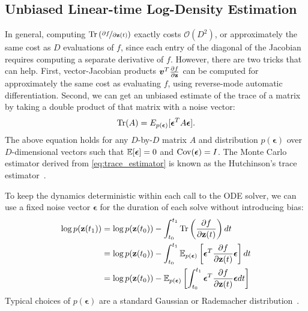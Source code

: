 \documentclass{article} %
\newcommand{\z}{\mathbf{z}}
\newcommand{\veps}{\bm{\epsilon}}
\newcommand{\JTr}{\Tr\left(\frac{\partial f}{\partial \z(t)}\right)}
\newcommand{\jtr}{\Tr\left(\nicefrac{\partial f}{\partial \z(t)}\right)}
\newcommand\0{\kern-1.2pt\vec{\kern1.2pt 0}}
\begin{document}
\subsection{Unbiased Linear-time Log-Density Estimation}

In general, computing $\jtr$ exactly costs $\mathcal{O}(D^2)$, or approximately the same cost as $D$ evaluations of $f$, since each entry of the diagonal of the Jacobian requires computing a separate derivative of $f$.
However, there are two tricks that can help.
First, vector-Jacobian products $\vv^T \frac{\partial f}{\partial \z}$ can be computed for approximately the same cost as evaluating $f$, using reverse-mode automatic differentiation.
Second, we can get an unbiased estimate of the trace of a matrix by taking a double product of that matrix with a noise vector:
%
\begin{align}\label{eq:trace_estimator}
\Tr(A) = E_{p(\veps)}[\veps^T A \veps].
\end{align}
%
The above equation holds for any $D$-by-$D$ matrix $A$ and distribution $p(\veps)$ over $D$-dimensional vectors such that $\E[\veps] = 0$ and $\Cov(\veps) = I$.
The Monte Carlo estimator derived from \eqref{eq:trace_estimator} is known as the Hutchinson's trace estimator~\citep{hutchinson1989trace,adams2018trace}.

To keep the dynamics deterministic within each call to the ODE solver, we can use a fixed noise vector $\veps$ for the duration of each solve without introducing bias:
%
\begin{align}\label{eq:stochastic_ode}
    \log p(\z(t_1)) & = \log p(\z(t_0)) - \int_{t_0}^{t_1} \JTr dt\nonumber\\
              &= \log p(\z(t_0)) - \int_{t_0}^{t_1} \E_{p(\veps)}\left[\veps^T \frac{\partial f}{\partial \z(t)}\veps\right]dt \nonumber\\
              &= \log p(\z(t_0)) - \E_{p(\veps)}\left[\int_{t_0}^{t_1} \veps^T \frac{\partial f}{\partial \z(t)}\veps dt \right]
\end{align}
%
Typical choices of $p(\veps)$ are a standard Gaussian or Rademacher distribution~\citep{hutchinson1989trace}. 
\end{document}
